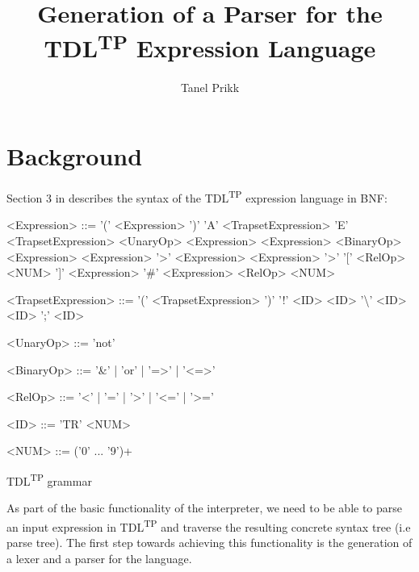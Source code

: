 \documentclass[12pt,oneside,a4paper,notitlepage]{report}
\title{
	Generation of a Parser for the TDL\textsuperscript{TP} Expression Language
}
\author{Tanel Prikk}
\newcommand{\texttilde}{\raisebox{0.5ex}{\texttildelow}}
\begin{document}
	\maketitle

	\section*{Background}
	\par Section 3 in \cite{tdlarticle} describes the syntax of the TDL\textsuperscript{TP} expression language in BNF:

	\begin{GrammarWrapper}
		\begin{grammar}
		<Expression>	::=	'(' <Expression> ')'
		\alt 				'A' <TrapsetExpression>
		\alt 				'E' <TrapsetExpression>
		\alt 				<UnaryOp> <Expression>
		\alt 				<Expression> <BinaryOp> <Expression>
		\alt 				<Expression> '\texttilde\textgreater' <Expression>
		\alt 				<Expression> '\texttilde\textgreater' '[' <RelOp> <NUM> ']' <Expression>
		\alt 				'\#' <Expression> <RelOp> <NUM>
		
		<TrapsetExpression>	::=	'(' <TrapsetExpression> ')'
		\alt						'!' <ID>
		\alt 						<ID> '\textbackslash' <ID>
		\alt						<ID> ';' <ID>
		
		<UnaryOp>	::= 'not'
		
		<BinaryOp>	::= '\&' | 'or' | '=\textgreater' | '\textless=\textgreater'
		
		<RelOp> 	::= '\textless' | '=' | '\textgreater' | '\textless=' | '\textgreater='
		
		<ID> 		::= 'TR' <NUM>
		
		<NUM> 		::= ('0' ... '9')+
		\end{grammar}
		\caption{TDL\textsuperscript{TP} grammar}\label{bnf:original}
	\end{GrammarWrapper}

	\newpage

	As part of the basic functionality of the interpreter, we need to be able to parse an input expression in TDL\textsuperscript{TP} and traverse the resulting concrete syntax tree (i.e parse tree). The first step towards achieving this functionality is the generation of a lexer and a parser for the language. 
\end{document}
